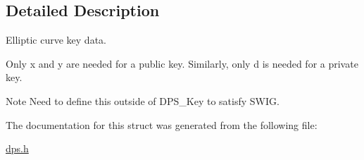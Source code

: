 \subsection{Detailed Description}
Elliptic curve key data. 

Only {\ttfamily x} and {\ttfamily y} are needed for a public key. Similarly, only {\ttfamily d} is needed for a private key.

\begin{DoxyNote}{Note}
Need to define this outside of D\+P\+S\+\_\+\+Key to satisfy S\+W\+IG. 
\end{DoxyNote}


The documentation for this struct was generated from the following file\+:\begin{DoxyCompactItemize}
\item 
\hyperlink{dps_8h}{dps.\+h}\end{DoxyCompactItemize}
